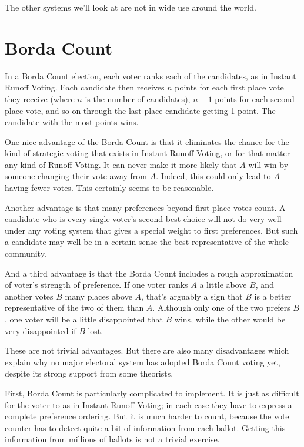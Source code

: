 \documentclass[openany]{book}
\begin{document}
The other systems we'll look at are not in wide use around the world.


\section{Borda Count}
In a Borda Count election, each voter ranks each of the candidates, as in Instant Runoff Voting. Each candidate then receives $n$ points for each first place vote they receive (where $n$ is the number of candidates), $n-1$ points for each second place vote, and so on through the last place candidate getting 1 point. The candidate with the most points wins.

One nice advantage of the Borda Count is that it eliminates the chance for the kind of strategic voting that exists in Instant Runoff Voting, or for that matter any kind of Runoff Voting. It can never make it more likely that $A$ will win by someone changing their vote away from $A$. Indeed, this could only lead to $A$ having fewer votes. This certainly seems to be reasonable.

Another advantage is that many preferences beyond first place votes count. A candidate who is every single voter's second best choice will not do very well under any voting system that gives a special weight to first preferences. But such a candidate may well be in a certain sense the best representative of the whole community.

And a third advantage is that the Borda Count includes a rough approximation of voter's strength of preference. If one voter ranks $A$ a little above $B$, and another votes $B$ many places above $A$, that's arguably a sign that $B$ is a better representative of the two of them than $A$. Although only one of the two prefers $B$, one voter will be a little disappointed that $B$ wins, while the other would be very disappointed if $B$ lost.

These are not trivial advantages. But there are also many disadvantages which explain why no major electoral system has adopted Borda Count voting yet, despite its strong support from some theorists.

First, Borda Count is particularly complicated to implement. It is just as difficult for the voter to as in Instant Runoff Voting; in each case they have to express a complete preference ordering. But it is much harder to count, because the vote counter has to detect quite a bit of information from each ballot. Getting this information from millions of ballots is not a trivial exercise.
\end{document}
